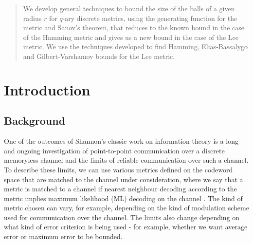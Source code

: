 \documentclass[conference,letterpaper]{IEEEtran}
\begin{document}
\maketitle

\begin{abstract}
  We develop general techniques to bound the size of the balls of a given radius $r$ for $q$-ary discrete metrics, using the generating function for the metric and Sanov's theorem, that reduces to the known bound in the case of the Hamming metric and gives us a new bound in the case of the Lee metric. We use the techniques developed to find Hamming, Elias-Bassalygo and Gilbert-Varshamov bounds for the Lee metric. 
\end{abstract}



\section{Introduction}
\subsection{Background}
One of the outcomes of Shannon's classic work on information theory is a long and ongoing investigation of point-to-point communication over a discrete memoryless channel and the limits of reliable communication over such a channel. To describe these limits, we can use various metrics defined on the codeword space that are matched to the channel under consideration, where we say that a metric is matched to a channel if nearest neighbour decoding according to the metric implies maximum likelihood (ML) decoding on the channel \cite{lee}. The kind of metric chosen can vary, for example, depending on the kind of modulation scheme used for communication over the channel. The limits also change depending on what kind of error criterion is being used - for example, whether we want average error or maximum error to be bounded.
\end{document}
